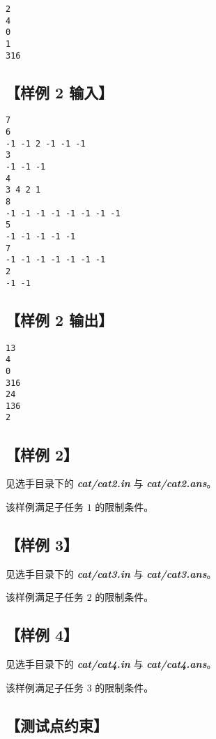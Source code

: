 \documentclass[UTF8]{ctexart}
\newcommand\file[1]{\textbf{\textit{#1}}}
\begin{document}
	\begin{lstlisting}
2
4
0
1
316
	\end{lstlisting}

	\subsection[样例 2 输入]{【样例 2 输入】}
	
	\begin{lstlisting}
7
6
-1 -1 2 -1 -1 -1
3
-1 -1 -1
4
3 4 2 1
8
-1 -1 -1 -1 -1 -1 -1 -1
5
-1 -1 -1 -1 -1
7
-1 -1 -1 -1 -1 -1 -1
2
-1 -1
	\end{lstlisting}
	
	\subsection[样例 2 输出]{【样例 2 输出】}
	
	\begin{lstlisting}
13
4
0
316
24
136
2
	\end{lstlisting}

	\subsection[样例 2]{【样例 2】}
	
	见选手目录下的 \file{cat/cat2.in} 与 \file{cat/cat2.ans}。
	
	该样例满足子任务 $1$ 的限制条件。
	
	\subsection[样例 3]{【样例 3】}
	
	见选手目录下的 \file{cat/cat3.in} 与 \file{cat/cat3.ans}。
	
	该样例满足子任务 $2$ 的限制条件。
	
	\subsection[样例 4]{【样例 4】}
	
	见选手目录下的 \file{cat/cat4.in} 与 \file{cat/cat4.ans}。
	
	该样例满足子任务 $3$ 的限制条件。
	
	\subsection[测试点约束]{【测试点约束】}
	
\end{document}
